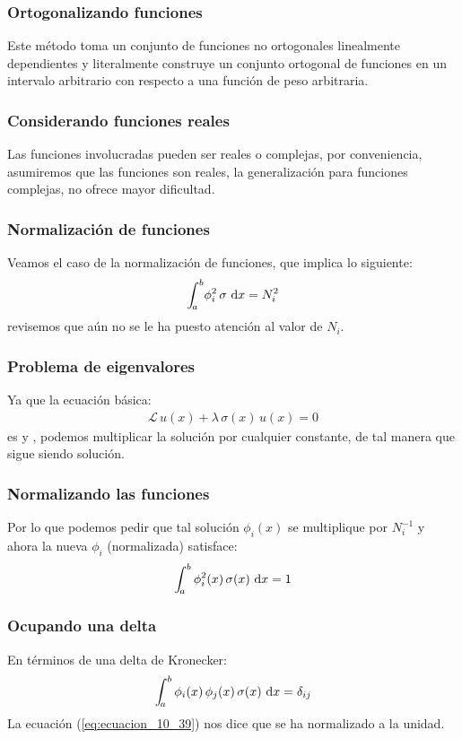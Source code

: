 \documentclass[12pt]{beamer}
\begin{document}
\begin{frame}
\frametitle{Ortogonalizando funciones}
Este método toma un conjunto de funciones no ortogonales linealmente dependientes y literalmente construye un conjunto ortogonal de funciones en un intervalo arbitrario con respecto a una función de peso arbitraria.
\end{frame}
\begin{frame}
\frametitle{Considerando funciones reales}
Las funciones involucradas pueden ser reales o complejas, por conveniencia, asumiremos que las funciones son reales, la generalización para funciones complejas, no ofrece mayor dificultad.
\end{frame}
\begin{frame}
\frametitle{Normalización de funciones}
Veamos el caso de la normalización de funciones, que implica lo siguiente:
\pause
\begin{align*}
\scaleint{5ex}_{\bs a}^{b} \phi_{i}^{2} \, \sigma  \, \dd{x}  =  N_{i}^{2}
\end{align*}
\pause
revisemos que aún no se le ha puesto atención al valor de $N_{i}$.
\end{frame}
\begin{frame}
\frametitle{Problema de eigenvalores}
Ya que la ecuación básica:
\pause
\begin{align}
\mathcal{L} \, u (x) + \lambda \, \sigma (x) \, u (x) = 0
\label{eq:ecuacion_10_08}
\end{align}
es  y , podemos multiplicar la solución por cualquier constante, de tal manera que sigue siendo solución.
\end{frame}
\begin{frame}
\frametitle{Normalizando las funciones}
Por lo que podemos pedir que tal solución $\phi_{i}(x)$ se multiplique por $N_{i}^{-1}$ \pause y ahora la nueva $\phi_{i}$ (normalizada) satisface:
\pause
\begin{align}
\scaleint{5ex}_{\bs a}^{b} \, \phi_{i}^{2} (x) \, \sigma(x) \, \dd{x} = 1
\label{eq:ecuacion_10_39}
\end{align}
\end{frame}
\begin{frame}
\frametitle{Ocupando una delta}
En términos de una delta de Kronecker:
\pause
\begin{align}
\scaleint{5ex}_{\bs a}^{b} \, \phi_{i}(x) \, \phi_{j} (x) \, \sigma (x) \, \dd{x} = \delta_{ij}
\label{eq:ecuacion_10_40}
\end{align}
\pause
La ecuación (\ref{eq:ecuacion_10_39}) nos dice que se ha normalizado a la unidad.
\end{frame}
\end{document}
